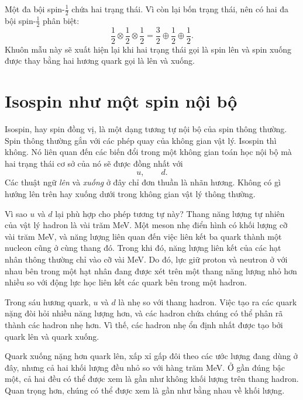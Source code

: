 Một đa bội spin-\(\tfrac12\) chứa hai trạng thái. Vì còn lại bốn trạng thái, nên có hai đa bội spin-\(\tfrac12\) phân biệt:
\begin{equation}
\frac12\otimes\frac12\otimes\frac12
=
\frac32\oplus\frac12\oplus\frac12.
\end{equation}
Khuôn mẫu này sẽ xuất hiện lại khi hai trạng thái gọi là spin lên và spin xuống được thay bằng hai hương quark gọi là lên và xuống.

\section{Isospin như một spin nội bộ}

Isospin, hay spin đồng vị, là một dạng tương tự nội bộ của spin thông thường. Spin thông thường gắn với các phép quay của không gian vật lý. Isospin thì không. Nó liên quan đến các biến đổi trong một không gian toán học nội bộ mà hai trạng thái cơ sở của nó sẽ được đồng nhất với
\begin{equation}
u,\qquad d.
\end{equation}
Các thuật ngữ \emph{lên} và \emph{xuống} ở đây chỉ đơn thuần là nhãn hương. Không có gì hướng lên trên hay xuống dưới trong không gian vật lý thông thường.


Vì sao \(u\) và \(d\) lại phù hợp cho phép tương tự này? Thang năng lượng tự nhiên của vật lý hadron là vài trăm MeV. Một meson nhẹ điển hình có khối lượng cỡ vài trăm MeV, và năng lượng liên quan đến việc liên kết ba quark thành một nucleon cũng ở cùng thang đó. Trong khi đó, năng lượng liên kết của các hạt nhân thông thường chỉ vào cỡ vài MeV. Do đó, lực giữ proton và neutron ở với nhau bên trong một hạt nhân đang được xét trên một thang năng lượng nhỏ hơn nhiều so với động lực học liên kết các quark bên trong một hadron.

Trong sáu hương quark, \(u\) và \(d\) là nhẹ so với thang hadron. Việc tạo ra các quark nặng đòi hỏi nhiều năng lượng hơn, và các hadron chứa chúng có thể phân rã thành các hadron nhẹ hơn. Vì thế, các hadron nhẹ ổn định nhất được tạo bởi quark lên và quark xuống.

Quark xuống nặng hơn quark lên, xấp xỉ gấp đôi theo các ước lượng đang dùng ở đây, nhưng cả hai khối lượng đều nhỏ so với hàng trăm MeV. Ở gần đúng bậc một, cả hai đều có thể được xem là gần như không khối lượng trên thang hadron. Quan trọng hơn, chúng có thể được xem là gần như bằng nhau về khối lượng.

